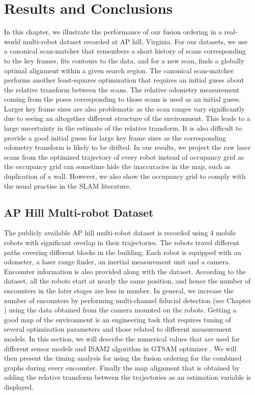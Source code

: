 \chapter{Results and Conclusions}
\label{chap:six}

In this chapter, we illustrate the performance of our fusion ordering in a real-world multi-robot dataset \cite{radish} recorded at AP hill, Virginia. For our datasets, we use a canonical scan-matcher \cite{csmicp} that remembers a short history of scans corresponding to the key frames, fits contours to the data, and for a new scan, finds a globally optimal alignment within a given search region. The canonical scan-matcher performs another least-squares optimization that requires an initial guess about the relative transform between the scans. The relative odometry measurement coming from the poses corresponding to those scans is used as an initial guess. Larger key frame sizes are also problematic as the scan ranges vary significantly due to seeing an altogether different structure of the environment. This leads to a large uncertainty in the estimate of the relative transform. It is also difficult to provide a good initial guess for large key frame sizes as the corresponding odometry transform is likely to be drifted. In our results, we project the raw laser scans from the optimized trajectory of every robot instead of occupancy grid as the occupancy grid can sometime hide the inaccuracies in the map, such as duplication of a wall. However, we also show the occupancy grid to comply with the usual practise in the SLAM literature.

\section{AP Hill Multi-robot Dataset}
The publicly available AP hill multi-robot dataset \cite{radish} is recorded using 4 mobile robots with significant overlap in their trajectories. The robots travel different paths covering different blocks in the building. Each robot is equipped with an odometer, a laser range finder, an inertial measurement unit and a camera. Encounter information is also provided along with the dataset. According to the dataset, all the robots start at nearly the same position, and hence the number of encounters in the later stages are less in number. In general, we increase the number of encounters by performing multi-channel fiducial detection (see Chapter \label{chap:five}) using the data obtained from the camera mounted on the robots. Getting a good map of the environment is an engineering task that requires tuning of several optimization parameters and those related to different measurement models. In this section, we will describe the numerical values that are used for different sensor models and ISAM2 algorithm in GTSAM optimizer \cite{gtsamhandson}. We will then present the timing analysis for using the fusion ordering for the combined graphs during every encounter. Finally the map alignment that is obtained by adding the relative transform between the trajectories as an estimation variable is displayed. 

